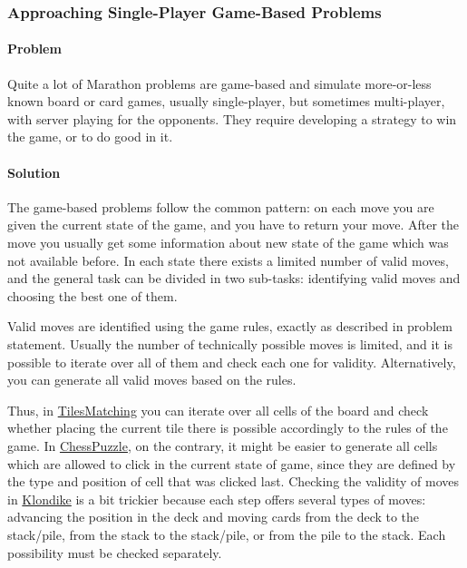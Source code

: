 \hypertarget{approaching-single-player-game-based-problems}{%
\subsubsection{Approaching Single-Player Game-Based
Problems}\label{approaching-single-player-game-based-problems}}

\hypertarget{problem-2}{%
\paragraph{Problem}\label{problem-2}}

Quite a lot of Marathon problems are game-based and simulate
more-or-less known board or card games, usually single-player, but
sometimes multi-player, with server playing for the opponents. They
require developing a strategy to win the game, or to do good in it.

\hypertarget{solution-1}{%
\paragraph{Solution}\label{solution-1}}

The game-based problems follow the common pattern: on each move you are
given the current state of the game, and you have to return your move.
After the move you usually get some information about new state of the
game which was not available before. In each state there exists a
limited number of valid moves, and the general task can be divided in
two sub-tasks: identifying valid moves and choosing the best one of
them.

Valid moves are identified using the game rules, exactly as described in
problem statement. Usually the number of technically possible moves is
limited, and it is possible to iterate over all of them and check each
one for validity. Alternatively, you can generate all valid moves based
on the rules.

Thus, in
\href{http://www.topcoder.com/longcontest/?module=ViewProblemStatement\&rd=13795\&pm=10410}{TilesMatching}
you can iterate over all cells of the board and check whether placing
the current tile there is possible accordingly to the rules of the game.
In
\href{http://www.topcoder.com/longcontest/?module=ViewProblemStatement\&rd=14196\&pm=10728}{ChessPuzzle},
on the contrary, it might be easier to generate all cells which are
allowed to click in the current state of game, since they are defined by
the type and position of cell that was clicked last. Checking the
validity of moves in
\href{http://www.topcoder.com/longcontest/?module=ViewProblemStatement\&rd=13565\&pm=10014}{Klondike}
is a bit trickier because each step offers several types of moves:
advancing the position in the deck and moving cards from the deck to the
stack/pile, from the stack to the stack/pile, or from the pile to the
stack. Each possibility must be checked separately.

